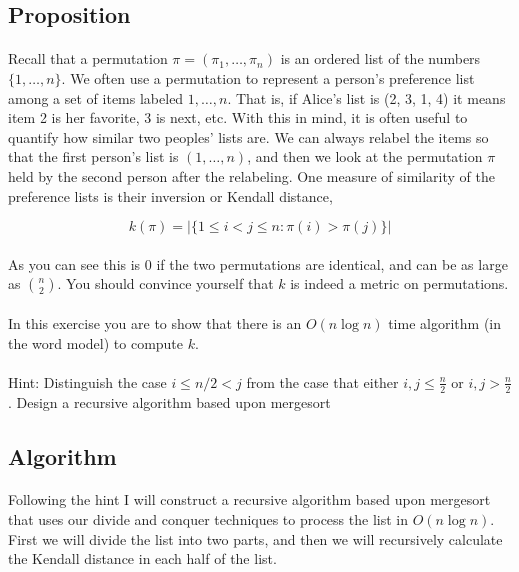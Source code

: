 \documentclass{article}
\begin{document}
\subsection{Proposition}

\paragraph{\indent}
Recall that a permutation \(\pi = (\pi_1,\ldots,\pi_n)\) is an ordered list of the numbers
\( \{1, \ldots , n\} \). We often use a permutation to represent a person’s preference
list among a set of items labeled \(1, \ldots, n\). That is, if Alice’s list is (2, 3, 1,
4) it means item 2 is her favorite, 3 is next, etc. With this in mind, it is often useful
to quantify how similar two peoples’ lists are. We can always relabel the items so that
the first person’s list is \((1, \ldots , n)\), and then we look at the permutation \(\pi
\) held by the second person after the relabeling. One measure of similarity of the
preference lists is their inversion or Kendall distance,

\[k(\pi) = |\{ 1 \leq i < j \leq n: \pi(i) > \pi(j) \}| \]

\paragraph{\indent}
As you can see this is 0 if the two permutations are identical, and can be as large as
\(\binom{n}{2}\). You should convince yourself that \(k\) is indeed a metric on
permutations.

\paragraph{\indent}
In this exercise you are to show that there is an \(O(n \log n)\) time algorithm (in the
word model) to compute \(k\).

\paragraph{\indent}
Hint: Distinguish the case \(i \leq n/2 < j\) from the case
that either \(i, j \leq \frac{n}{2}\) or \(i, j > \frac{n}{2}\). Design a recursive
algorithm based upon mergesort


\subsection{Algorithm}

\paragraph{\indent}
Following the hint I will construct a recursive algorithm based upon mergesort that uses
our divide and conquer techniques to process the list in \(O(n \log n)\).
First we will divide the list into two parts, and then we will recursively calculate the
Kendall distance in each half of the list.
\end{document}
